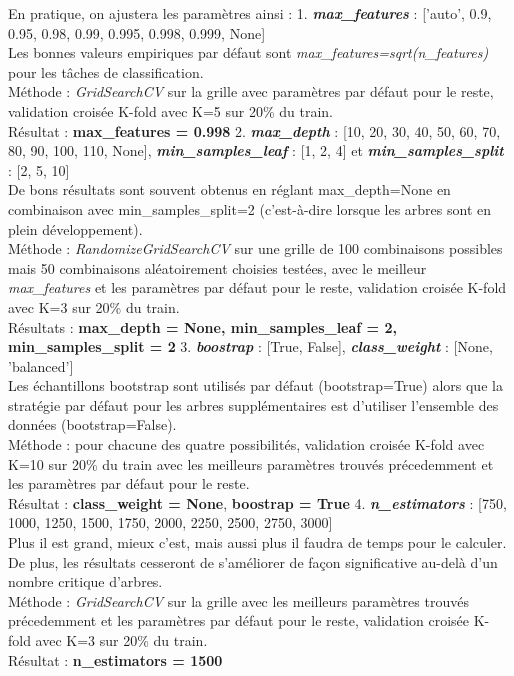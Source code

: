 \documentclass[11pt]{article}
\begin{document}
En pratique, on ajustera les paramètres ainsi : 1.
\textbf{\emph{max\_features}} : {[}'auto', 0.9, 0.95, 0.98, 0.99, 0.995,
0.998, 0.999, None{]}\\
Les bonnes valeurs empiriques par défaut sont
\emph{max\_features=sqrt(n\_features)} pour les tâches de
classification.\\
Méthode : \emph{GridSearchCV} sur la grille avec paramètres par défaut
pour le reste, validation croisée K-fold avec K=5 sur 20\% du train.\\
Résultat : \textbf{max\_features = 0.998} 2. \textbf{\emph{max\_depth}}
: {[}10, 20, 30, 40, 50, 60, 70, 80, 90, 100, 110, None{]},
\textbf{\emph{min\_samples\_leaf}} : {[}1, 2, 4{]} et
\textbf{\emph{min\_samples\_split}} : {[}2, 5, 10{]}\\
De bons résultats sont souvent obtenus en réglant max\_depth=None en
combinaison avec min\_samples\_split=2 (c'est-à-dire lorsque les arbres
sont en plein développement).\\
Méthode : \emph{RandomizeGridSearchCV} sur une grille de 100
combinaisons possibles mais 50 combinaisons aléatoirement choisies
testées, avec le meilleur \emph{max\_features} et les paramètres par
défaut pour le reste, validation croisée K-fold avec K=3 sur 20\% du
train.\\
Résultats : \textbf{max\_depth = None, min\_samples\_leaf = 2,
min\_samples\_split = 2} 3. \textbf{\emph{boostrap}} : {[}True,
False{]}, \textbf{\emph{class\_weight}} : {[}None, 'balanced'{]}\\
Les échantillons bootstrap sont utilisés par défaut (bootstrap=True)
alors que la stratégie par défaut pour les arbres supplémentaires est
d'utiliser l'ensemble des données (bootstrap=False).\\
Méthode : pour chacune des quatre possibilités, validation croisée
K-fold avec K=10 sur 20\% du train avec les meilleurs paramètres trouvés
précedemment et les paramètres par défaut pour le reste.\\
Résultat : \textbf{class\_weight = None}, \textbf{boostrap = True} 4.
\textbf{\emph{n\_estimators}} : {[}750, 1000, 1250, 1500, 1750, 2000,
2250, 2500, 2750, 3000{]}\\
Plus il est grand, mieux c'est, mais aussi plus il faudra de temps pour
le calculer. De plus, les résultats cesseront de s'améliorer de façon
significative au-delà d'un nombre critique d'arbres.\\
Méthode : \emph{GridSearchCV} sur la grille avec les meilleurs
paramètres trouvés précedemment et les paramètres par défaut pour le
reste, validation croisée K-fold avec K=3 sur 20\% du train.\\
Résultat : \textbf{n\_estimators = 1500}
\end{document}
